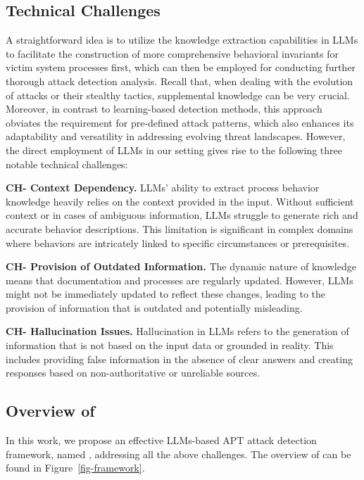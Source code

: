 \subsection{Technical Challenges}\label{sec:challenges}
A straightforward idea is to utilize the knowledge extraction capabilities in LLMs to facilitate the construction of more comprehensive behavioral invariants for victim system processes first, which can then be employed for conducting further thorough attack detection analysis. Recall that,
when dealing with the evolution of attacks or their stealthy tactics, supplemental knowledge can be very crucial. Moreover, in contrast to learning-based detection methods, this approach obviates the requirement for pre-defined attack patterns, which also enhances its adaptability and versatility in addressing evolving threat landscapes.
However, the direct employment of LLMs in our setting gives rise to the following three notable technical challenges:

\noindent
{\bf CH- Context Dependency.} %
LLMs' ability to extract process behavior knowledge heavily relies on the context provided in the input. Without sufficient context or in cases of ambiguous information, LLMs struggle to generate rich and accurate behavior descriptions. This limitation is significant in complex domains where behaviors are intricately linked to specific circumstances or prerequisites.

\noindent
{\bf CH- Provision of Outdated Information.} %
The dynamic nature of knowledge means that documentation and processes are regularly updated. However, LLMs might not be immediately updated to reflect these changes, leading to the provision of information that is outdated and potentially misleading.

\noindent
{\bf CH- Hallucination Issues.} %
Hallucination in LLMs refers to the generation of information that is not based on the input data or grounded in reality. This includes providing false information in the absence of clear answers and creating responses based on non-authoritative or unreliable sources.


\subsection{Overview of \tool}
In this work, we propose an effective LLMs-based APT attack detection framework, named \tool, addressing all the above challenges. The overview of \tool can be found in Figure~\ref{fig-framework}.

